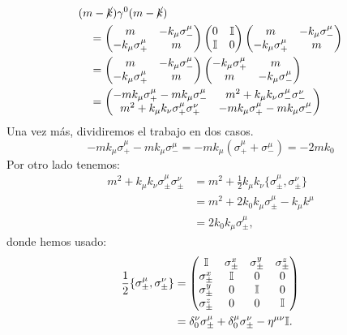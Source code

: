 \begin{equation}\begin{split}
&(m-\cancel k)\gamma^0(m-\cancel k)\\
&\quad=
\begin{pmatrix}
m&-k_\mu\sigma_-^\mu\\
-k_\mu\sigma_+^\mu&m
\end{pmatrix}
\begin{pmatrix}0&\mathbb I\\\mathbb I&0\end{pmatrix}
\begin{pmatrix}
m&-k_\mu\sigma_-^\mu\\
-k_\mu\sigma_+^\mu&m
\end{pmatrix}\\
&\quad=
\begin{pmatrix}
m&-k_\mu\sigma_-^\mu\\
-k_\mu\sigma_+^\mu&m
\end{pmatrix}
\begin{pmatrix}
-k_\mu\sigma_+^\mu&m\\
m&-k_\mu\sigma_-^\mu
\end{pmatrix}\\
&\quad=
\begin{pmatrix}
-mk_\mu\sigma_+^\mu -mk_\mu\sigma_-^\mu &
m^2+k_\mu k_\nu\sigma_-^\mu\sigma_-^\nu \\
m^2+k_\mu k_\nu\sigma_+^\mu\sigma_+^\nu &
-mk_\mu\sigma_+^\mu -mk_\mu\sigma_-^\mu
\end{pmatrix}
\end{split}\label{public}\end{equation}
Una vez más, dividiremos el trabajo en dos casos.
\begin{equation}
-mk_\mu\sigma_+^\mu -mk_\mu\sigma_-^\mu
=-mk_\mu(\sigma_+^\mu+\sigma_-^\mu)
=-2mk_0
\end{equation}
Por otro lado tenemos:
\begin{equation}\begin{split}
m^2+k_\mu k_\nu\sigma_\pm^\mu\sigma_\pm^\nu
&=m^2+\frac12k_\mu k_\nu\{\sigma_\pm^\mu,\sigma_\pm^\nu\}\\
&=m^2+2k_0k_\mu\sigma_\pm^\mu-k_\mu k^\mu\\
&=2k_0k_\mu\sigma_\pm^\mu,
\end{split}\end{equation}
donde hemos usado:
\begin{equation}\begin{split}
\frac12\{\sigma_\pm^\mu,\sigma_\pm^\nu\}
&=\begin{pmatrix}
\mathbb I&\sigma_\pm^x&\sigma_\pm^y&\sigma_\pm^z\\
\sigma_\pm^x&\mathbb I&0&0\\
\sigma_\pm^y&0&\mathbb I&0\\
\sigma_\pm^z&0&0&\mathbb I
\end{pmatrix}\\
&=\delta_0^\nu\sigma_\pm^\mu+\delta_0^\mu\sigma_\pm^\nu-\eta^{\mu\nu}\mathbb I.
\end{split}\label{gordo}\end{equation}
